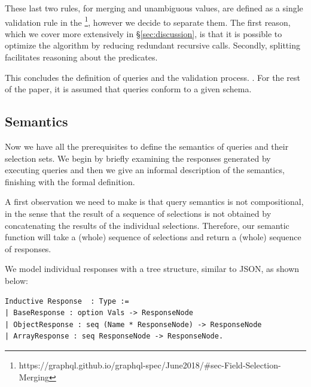 				
These last two rules, for merging and unambiguous values, are defined as a single validation rule in the \spec\footnote{https://graphql.github.io/graphql-spec/June2018/\#sec-Field-Selection-Merging}, however we decide to separate them. The first reason, which we cover more extensively in \S\ref{sec:discussion}, is that it is possible to optimize the algorithm by reducing redundant recursive calls. Secondly, splitting facilitates reasoning about the predicates.



This concludes the definition of \gql queries and the validation process. . For the rest of the paper, it is assumed that queries conform to a given schema. 

\subsection{Semantics}\label{subsec:semantics}
Now we have all the prerequisites to define the semantics of \gql queries and their selection sets. We begin by briefly examining the responses generated by executing queries and then we give an informal description of the semantics, finishing with the formal definition. %

A first observation we need to make is that query semantics is not compositional, in the sense that the result of a sequence of selections is not obtained by concatenating the results of the individual selections. Therefore, our semantic function will take a (whole) sequence of selections and return a (whole) sequence of responses.  

We model individual responses with a tree structure, similar to JSON, as shown below:
%
\begin{verbatim}
Inductive Response  : Type :=
| BaseResponse : option Vals -> ResponseNode
| ObjectResponse : seq (Name * ResponseNode) -> ResponseNode
| ArrayResponse : seq ResponseNode -> ResponseNode.
\end{verbatim}

